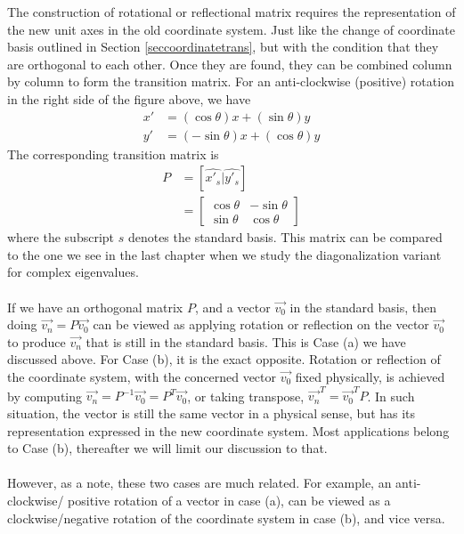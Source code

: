 The construction of rotational or reflectional matrix requires the representation of the new unit axes in the old coordinate system. Just like the change of coordinate basis outlined in Section \ref{seccoordinatetrans}, but with the condition that they are orthogonal to each other. Once they are found, they can be combined column by column to form the transition matrix. For an anti-clockwise (positive) rotation in the right side of the figure above, we have
\begin{align*}
x' &= (\cos \theta) x + (\sin \theta) y \\
y' &= (- \sin \theta) x + (\cos \theta) y
\end{align*}
The corresponding transition matrix is
\begin{align*}
P &= [\hat{x'_s}|\hat{y'_s}] \\
&= \begin{bmatrix}
\cos \theta & -\sin \theta \\
\sin \theta & \cos \theta
\end{bmatrix}
\end{align*}
where the subscript $s$ denotes the standard basis. This matrix can be compared to the one we see in the last chapter when we study the diagonalization variant for complex eigenvalues.\\
\\
If we have an orthogonal matrix $P$, and a vector $\vec{v_0}$ in the standard basis, then doing $\vec{v_n} = P\vec{v_0}$ can be viewed as applying rotation or reflection on the vector $\vec{v_0}$ to produce $\vec{v_n}$ that is still in the standard basis. This is Case (a) we have discussed above. For Case (b), it is the exact opposite. Rotation or reflection of the coordinate system, with the concerned vector $\vec{v_0}$ fixed physically, is achieved by computing $\vec{v_n} = P^{-1}\vec{v_0}= P^T\vec{v_0}$, or taking transpose, $\vec{v_n}^T = \vec{v_0}^T P$. In such situation, the vector is still the same vector in a physical sense, but has its representation expressed in the new coordinate system. Most applications belong to Case (b), thereafter we will limit our discussion to that.\\
\\
However, as a note, these two cases are much related. For example, an anti-clockwise/ positive rotation of a vector in case (a), can be viewed as a clockwise/negative rotation of the coordinate system in case (b), and vice versa.

